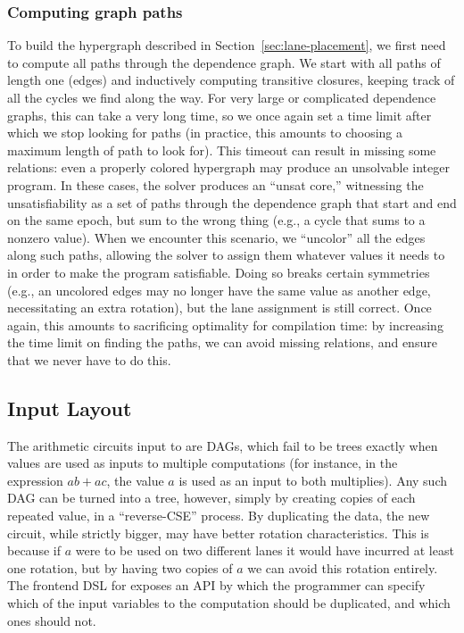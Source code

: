 \subsubsection*{Computing graph paths}\label{sec:computing-graph-paths}
To build the hypergraph described in Section~\ref{sec:lane-placement}, we first need to compute all paths through the dependence graph.
We start with all paths of length one (edges) and inductively computing transitive closures, keeping track of all the cycles we find along the way.
For very large or complicated dependence graphs, this can take a very long time, so we once again set a time limit after which we stop looking for paths (in practice, this amounts to choosing a maximum length of path to look for).
This timeout can result in missing some relations: even a properly colored hypergraph may produce an unsolvable integer program.
In these cases, the solver produces an ``unsat core,'' witnessing the unsatisfiability as a set of paths through the dependence graph that start and end on the same epoch, but sum to the wrong thing (e.g., a cycle that sums to a nonzero value).
When we encounter this scenario, we ``uncolor'' all the edges along such paths, allowing the solver to assign them whatever values it needs to in order to make the program satisfiable.
Doing so breaks certain symmetries (e.g., an uncolored edges may no longer have the same value as another edge, necessitating an extra rotation), but the lane assignment is still correct.
Once again, this amounts to sacrificing optimality for compilation time: by increasing the time limit on finding the paths, we can avoid missing relations, and ensure that we never have to do this.

\subsection{Input Layout}\label{sec:duplicating-inputs}
The arithmetic circuits input to \system are DAGs, which fail to be trees exactly when values are used as inputs to multiple computations (for instance, in the expression $ab + ac$, the value $a$ is used as an input to both multiplies).
Any such DAG can be turned into a tree, however, simply by creating copies of each repeated value, in a ``reverse-CSE'' process.
By duplicating the data, the new circuit, while strictly bigger, may have better rotation characteristics.
This is because if $a$ were to be used on two different lanes it would have incurred at least one rotation, but by having two copies of $a$ we can avoid this rotation entirely. The frontend DSL for \system exposes an API by which the programmer can specify which of the input variables to the computation should be duplicated, and which ones should not.

